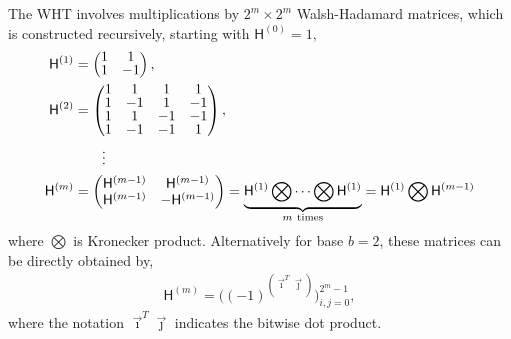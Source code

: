\documentclass{iitthesis}          %
\newcommand{\mH}{\mathsf{H}}
\begin{document}
The WHT involves multiplications by $2^m \times 2^m$ Walsh-Hadamard matrices, which is constructed recursively, starting with $\mH^{(0)} = 1$,
\begin{align}
\nonumber
\arraycolsep=1.4pt\def\arraystretch{0.9}
\mH^{(1)} &=
\begin{pmatrix}
1 & 1 \\ 1 & -1
\end{pmatrix}, \\
\nonumber
\mH^{(2)} &= 
\begin{pmatrix}
1 & 1 & 1 & 1 \\ 
1 & -1 & 1 & -1 \\
1 & 1 & -1 & -1 \\ 
1 & -1 & -1 & 1 \\
\end{pmatrix}, \\
\nonumber
& \qquad \vdots
\\
\label{eqn:hadamard_matrix}
\mH^{(m)} &= 
\begin{pmatrix}
\mH^{(m-1)} & \mH^{(m-1)} \\ \mH^{(m-1)} & -\mH^{(m-1)}
\end{pmatrix} 
= \underbrace{\mH^{(1)} \bigotimes \cdots \bigotimes \mH^{(1)}}_{m \ \text{times}} 
= \mH^{(1)} \bigotimes \mH^{(m-1)}
\end{align}
where $\bigotimes$ is Kronecker product. Alternatively for base $b=2$, these matrices can be  directly obtained by,
\begin{align*}
\mH^{(m)} %
= \bigg((-1)^{(\vec{\imath}^T \vec{\jmath})} \bigg)_{i,j=0}^{2^m-1},
\end{align*}
where the notation $\vec{\imath}^T \vec{\jmath}$ indicates the bitwise dot product. 

\end{document}
